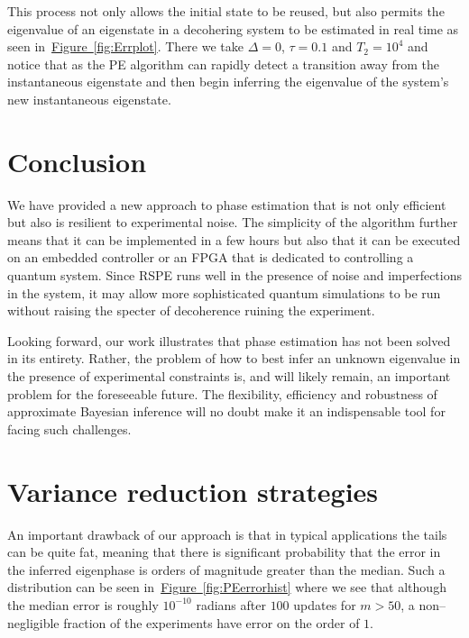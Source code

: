 \documentclass[aps,pra,amsmath,twocolumn,amssymb,superscriptaddress]{revtex4-1}
\newcommand{\fig}[1]{\hyperref[fig:#1]{Figure~\ref*{fig:#1}}}
\begin{document}
This process not only allows the initial state to be reused, but also permits the eigenvalue of an eigenstate in a decohering system to be estimated in real time as seen in~\fig{Errplot}.  There we take $\Delta=0$, $\tau=0.1$ and $T_2=10^4$ and notice that as the PE algorithm can rapidly detect a transition away from the instantaneous eigenstate and then begin inferring the eigenvalue of the system's new instantaneous eigenstate.  
\section{Conclusion}

We have provided a new approach to phase estimation that is not only efficient but also is resilient to experimental noise.  The simplicity of the algorithm further means that it can be implemented in a few hours but also that it can be executed on an embedded controller or an FPGA that is dedicated to controlling a quantum system. Since RSPE runs well in the presence of noise and imperfections in the system, it may allow more sophisticated quantum simulations to be run without raising the specter of decoherence ruining the experiment.  

Looking forward, our work illustrates that phase estimation has not been solved in its entirety.  Rather, the problem of how to best infer an unknown eigenvalue in the presence of experimental constraints is, and will likely remain, an important problem for the foreseeable future.  The flexibility, efficiency and robustness of approximate Bayesian inference will
no doubt make it an indispensable tool for facing such challenges.
% 

\pagebreak
\appendix


\onecolumngrid
\section{Variance reduction strategies}
An important drawback of our approach is that in typical applications the tails can be quite fat, meaning that there is significant probability that the error in the inferred eigenphase is orders of magnitude greater than the median.  Such a distribution can be seen in~\fig{PEerrorhist} where we see that although the median error is roughly $10^{-10}$ radians after $100$ updates for $m>50$,  a non--negligible fraction of the experiments have error on the order of $1$.  
\end{document}
